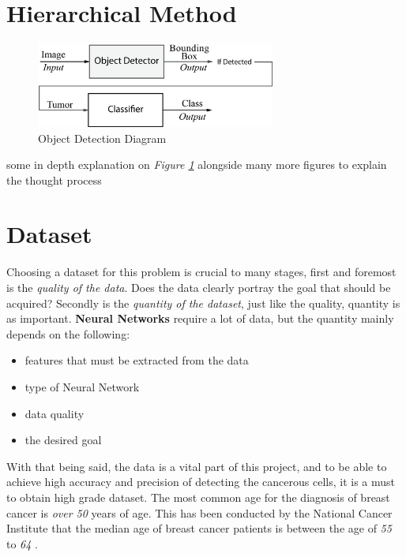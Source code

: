 \documentclass[12pt]{extarticle}
\begin{document}
	\newpage
	
	
	\section{Hierarchical Method}\label{Meth}
	
	\begin{figure}[h]
		\centering
		\includegraphics[width=0.7\textwidth]{pics/Figures/Hierarchical_Obj_Det_Block_Diagram.eps}
		\caption{\small{Object Detection Diagram}}
		\label{fig:Hierarchical Obj Detector}
	\end{figure}
	some in depth explanation on \emph{Figure \ref{fig:Hierarchical Obj Detector}} alongside many more figures to explain the thought process 
	\section{Dataset}\label{Data}
	
	Choosing a dataset for this problem is crucial to many stages, first and foremost is the \emph{quality of the data}. Does the data clearly portray the goal that should be acquired? Secondly is the \emph{quantity of the dataset}, just like the quality, quantity is as important. \textbf{Neural Networks} require a lot of data, but the quantity mainly depends on the following:
	\begin{itemize}
		\item features that must be extracted from the data
		\item type of Neural Network
		\item data quality
		\item the desired goal
	\end{itemize}
	With that being said, the data is a vital part of this project, and to be able to achieve high accuracy and precision of detecting the cancerous cells, it is a must to obtain high grade dataset. 
	The most common age for the diagnosis of breast cancer is \emph{over 50} years of age. This has been conducted by the National Cancer Institute that the median age of breast cancer patients is between the age of \emph{55} to \emph{64} \cite{CDC}. 
	\\[5mm]
	
\end{document}
